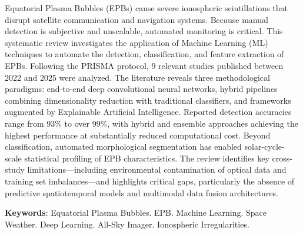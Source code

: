 \begin{resumoumacoluna}[Abstract]

Equatorial Plasma Bubbles (EPBs) cause severe ionospheric scintillations
that disrupt satellite communication and navigation systems. Because
manual detection is subjective and unscalable, automated monitoring is
critical. This systematic review investigates the application of Machine
Learning (ML) techniques to automate the detection, classification, and
feature extraction of EPBs. Following the PRISMA protocol, 9 relevant
studies published between 2022 and 2025 were analyzed. The literature
reveals three methodological paradigms: end-to-end deep convolutional
neural networks, hybrid pipelines combining dimensionality reduction
with traditional classifiers, and frameworks augmented by Explainable
Artificial Intelligence. Reported detection accuracies range from 93\%
to over 99\%, with hybrid and ensemble approaches achieving the highest
performance at substantially reduced computational cost. Beyond
classification, automated morphological segmentation has enabled
solar-cycle-scale statistical profiling of EPB characteristics. The
review identifies key cross-study limitations---including environmental
contamination of optical data and training set imbalances---and
highlights critical gaps, particularly the absence of predictive
spatiotemporal models and multimodal data fusion architectures.

\vspace{\onelineskip}
\noindent\textbf{Keywords}: Equatorial Plasma Bubbles. EPB. Machine Learning. Space Weather. Deep Learning. All-Sky Imager. Ionospheric Irregularities.

\end{resumoumacoluna}
